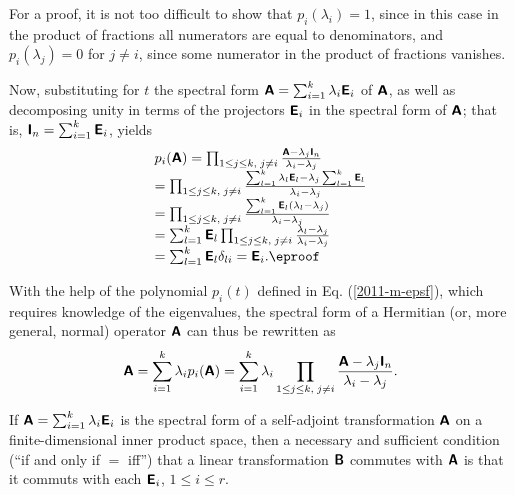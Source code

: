 {\color{OliveGreen}\bproof

For a proof, it is not too difficult
to show that
$p_i  (\lambda_i)=1$, since in this case in the product of fractions all numerators are equal to denominators,
and
$p_i  (\lambda_j)=0$ for $j\neq i $, since some numerator in the product of fractions vanishes.

Now, substituting for $t$ the spectral form $\textsf{\textbf{A}}=\sum_{i=1}^k \lambda_i\textsf{\textbf{E}}_i$
of $\textsf{\textbf{A}}$, as well as
decomposing unity in terms of the projectors $\textsf{\textbf{E}}_i$ in the spectral form of
$\textsf{\textbf{A}}$; that is, $\textsf{\textbf{I}}_n=\sum_{i=1}^k \textsf{\textbf{E}}_i$,
yields
\begin{equation}
\begin{array}{l}
p_i  (\textsf{\textbf{A}})
=
\prod_{
1\le j\le k,\;
j\neq i
}\frac{\textsf{\textbf{A}} - \lambda_j\textsf{\textbf{I}}_n}{\lambda_i -\lambda_j}  \\
=
\prod_{
1\le j\le k,\;
j\neq i
}\frac{\sum_{l=1}^k \lambda_l\textsf{\textbf{E}}_l - \lambda_j\sum_{l=1}^k \textsf{\textbf{E}}_l}{\lambda_i -\lambda_j}  \\
=
\prod_{
1\le j\le k,\;
j\neq i
}\frac{\sum_{l=1}^k \textsf{\textbf{E}}_l(\lambda_l- \lambda_j)}{\lambda_i -\lambda_j}  \\
= \sum_{l=1}^k \textsf{\textbf{E}}_l
\prod_{
1\le j\le k,\;
j\neq i
}\frac{\lambda_l- \lambda_j}{\lambda_i -\lambda_j}  \\
= \sum_{l=1}^k \textsf{\textbf{E}}_l
\delta_{li} = \textsf{\textbf{E}}_i.  \textrm{\eproof}
\end{array}
\end{equation}
}

With the help of the polynomial $p_i(t)$ defined in Eq. (\ref{2011-m-epsf}),
which requires knowledge of the eigenvalues,
the spectral form of a Hermitian (or, more general, normal) operator  $\textsf{\textbf{A}}$ can thus be rewritten as
\begin{equation}
\textsf{\textbf{A}}=\sum_{i=1}^k \lambda_i p_i(\textsf{\textbf{A}})=  \sum_{i=1}^k \lambda_i \prod_{
1\le j\le k,\;
j\neq i
}\frac{\textsf{\textbf{A}} - \lambda_j\textsf{\textbf{I}}_n}{\lambda_i -\lambda_j}.
\end{equation}

If $\textsf{\textbf{A}}=\sum_{i=1}^k \lambda_i\textsf{\textbf{E}}_i$
is the spectral form of a self-adjoint transformation  $\textsf{\textbf{A}}$
on a finite-dimensional inner product space,
then a necessary and sufficient condition (``if and only if $=$ iff'')
that a linear transformation
 $\textsf{\textbf{B}}$ commutes with
 $\textsf{\textbf{A}}$
is that it commuts with each
$\textsf{\textbf{E}}_i$, $1\le i\le r$.





